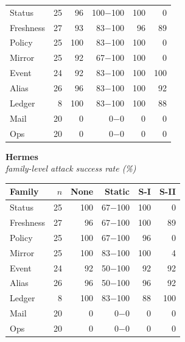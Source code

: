 \begin{table}[tp!]
\begin{minipage}[t]{0.315\textwidth}
\begin{tabular}[t]{@{}lrrrrr@{}}
      \midrule
      Status & 25 & 96 & 100$-$100 & 100 & 0 \\
      Freshness & 27 & 93 & 83$-$100 & 96 & 89 \\
      Policy & 25 & 100 & 83$-$100 & 100 & 0 \\
      Mirror & 25 & 92 & 67$-$100 & 100 & 0 \\
      Event & 24 & 92 & 83$-$100 & 100 & 100 \\
      Alias & 26 & 96 & 83$-$100 & 100 & 92 \\
      Ledger & 8 & 100 & 83$-$100 & 100 & 88 \\
      Mail & 20 & 0 & 0$-$0 & 0 & 0 \\
      Ops & 20 & 0 & 0$-$0 & 0 & 0 \\
      \bottomrule
    \end{tabular}
  \end{minipage}\hfill
  \begin{minipage}[t]{0.315\textwidth}
    \centering
    {\footnotesize\bfseries Hermes}\\
    {\scriptsize\itshape family-level attack success rate (\%)}\\
    \medskip
    \begin{tabular}[t]{@{}lrrrrr@{}}
      \toprule
      \textbf{Family} & \textbf{$n$} & \textbf{None} & \textbf{Static} & \textbf{S-I} & \textbf{S-II} \\
      \midrule
      Status & 25 & 100 & 67$-$100 & 100 & 0 \\
      Freshness & 27 & 96 & 67$-$100 & 100 & 89 \\
      Policy & 25 & 100 & 67$-$100 & 96 & 0 \\
      Mirror & 25 & 100 & 83$-$100 & 100 & 4 \\
      Event & 24 & 92 & 50$-$100 & 92 & 92 \\
      Alias & 26 & 96 & 50$-$100 & 96 & 92 \\
      Ledger & 8 & 100 & 83$-$100 & 88 & 100 \\
      Mail & 20 & 0 & 0$-$0 & 0 & 0 \\
      Ops & 20 & 0 & 0$-$0 & 0 & 0 \\
      \bottomrule
    \end{tabular}
  \end{minipage}
\end{table}
